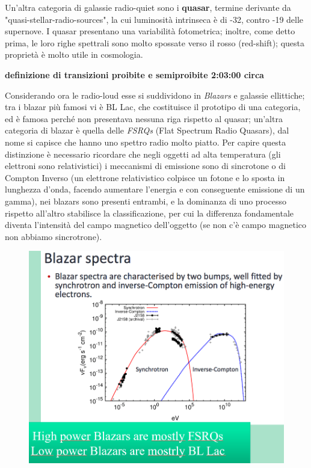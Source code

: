 Un'altra categoria di galassie radio-quiet sono i \textbf{quasar}, termine derivante da "quasi-stellar-radio-sources", la cui luminosità intrinseca è di -32, contro -19 delle supernove. I quasar presentano una variabilità fotometrica; inoltre, come detto prima, le loro righe spettrali sono molto spossate verso il rosso (red-shift); questa proprietà è molto utile in cosmologia.

\textbf{definizione di transizioni proibite e semiproibite 2:03:00 circa}

Considerando ora le radio-loud esse si suddividono in \textit{Blazars} e galassie ellittiche; tra i blazar più famosi vi è BL Lac, che costituisce il prototipo di una categoria, ed è famosa perché non presentava nessuna riga rispetto al quasar; un'altra categoria di blazar è quella delle \textit{FSRQs} (Flat Spectrum Radio Quasars), dal nome si capisce che hanno uno spettro radio molto piatto. Per capire questa distinzione è necessario ricordare che negli oggetti ad alta temperatura (gli elettroni sono relativistici) i meccanismi di emissione sono di sincrotone o di Compton Inverso (un elettrone relativistico colpisce un fotone e lo sposta in lunghezza d'onda, facendo aumentare l'energia e con conseguente emissione di un gamma), nei blazars sono presenti entrambi, e la dominanza di uno processo rispetto all'altro stabilisce la classificazione, per cui la differenza fondamentale diventa l'intensità del campo magnetico dell'oggetto (se non c'è campo magnetico non abbiamo sincrotrone).

\begin{figure}[H]
    \centering
    \includegraphics[width=\textwidth]{immagini_lezioni12-12/47.png}
\end{figure}


